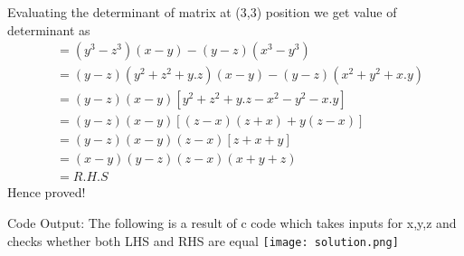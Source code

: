 \documentclass{beamer}
\begin{document}
     \begin{frame}
              Evaluating the determinant of matrix at (3,3) position we get value of determinant as 
     \begin{align}
        & = (y^3-z^3)(x-y)-(y-z)(x^3-y^3)\\
        & =(y-z)(y^2+z^2+y.z)(x-y)-(y-z)(x^2+y^2+x.y)\\
        & =(y-z)(x-y)[y^2+z^2+y.z-x^2-y^2-x.y]\\
        & =(y-z)(x-y)[(z-x)(z+x)+y(z-x)]\\
        & =(y-z)(x-y)(z-x)[z+x+y]\\
        & =(x-y)(y-z)(z-x)(x+y+z)\\
        & =R.H.S
     \end{align}
     Hence proved!
     \end{frame}
\begin{frame}{Code Output:}
The following is a result of c code which takes inputs for x,y,z and checks whether both LHS and RHS are equal
\texttt{[image: solution.png]}
\end{frame}
\end{document}

